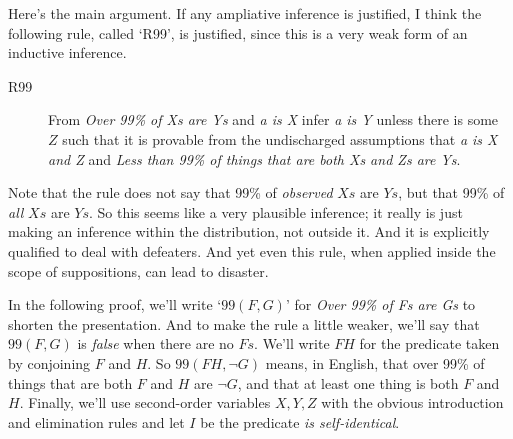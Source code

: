 Here's the main argument. If any ampliative inference is justified, I think the following rule, called `R99', is justified, since this is a very weak form of an inductive inference.

\begin{description}
\item[R99] From \textit{Over 99\% of Xs are Ys} and \textit{a is X} infer \textit{a is Y} unless there is some $Z$ such that it is provable from the undischarged assumptions that \textit{a is X and Z} and \textit{Less than 99\% of things that are both Xs and Zs are Ys}.
\end{description}

\noindent Note that the rule does not say that 99\% of \textit{observed} $Xs$ are $Ys$, but that 99\% of \textit{all} $Xs$ are $Ys$. So this seems like a very plausible inference; it really is just making an inference within the distribution, not outside it. And it is explicitly qualified to deal with defeaters. And yet even this rule, when applied inside the scope of suppositions, can lead to disaster. 

In the following proof, we'll write `$99(F, G)$' for \textit{Over 99\% of Fs are Gs} to shorten the presentation. And to make the rule a little weaker, we'll say that $99(F, G)$ is \textit{false} when there are no $Fs$. We'll write $FH$ for the predicate taken by conjoining $F$ and $H$. So $99(FH, \neg G)$ means, in English, that over 99\% of things that are both $F$ and $H$ are $\neg G$, and that at least one thing is both $F$ and $H$. Finally, we'll use second-order variables $X, Y, Z$ with the obvious introduction and elimination rules and let $I$ be the predicate \textit{is self-identical}.

